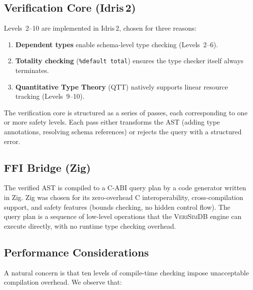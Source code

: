 \documentclass[11pt,a4paper]{article}
\newcommand{\VeriSimDB}{\textsc{VeriSimDB}}
\begin{document}
\subsection{Verification Core (Idris\,2)}

Levels~2--10 are implemented in Idris\,2, chosen for three reasons:
\begin{enumerate}[nosep]
  \item \textbf{Dependent types} enable schema-level type checking
    (Levels~2--6).
  \item \textbf{Totality checking} (\texttt{\%default total}) ensures
    the type checker itself always terminates.
  \item \textbf{Quantitative Type Theory} (QTT) natively supports
    linear resource tracking (Levels~9--10).
\end{enumerate}

The verification core is structured as a series of passes, each
corresponding to one or more safety levels.  Each pass either
transforms the AST (adding type annotations, resolving schema
references) or rejects the query with a structured error.

\subsection{FFI Bridge (Zig)}

The verified AST is compiled to a C-ABI query plan by a code generator
written in Zig.  Zig was chosen for its zero-overhead C interoperability,
cross-compilation support, and safety features (bounds checking,
no hidden control flow).  The query plan is a sequence of low-level
operations that the \VeriSimDB{} engine can execute directly, with
no runtime type checking overhead.

\subsection{Performance Considerations}

A natural concern is that ten levels of compile-time checking impose
unacceptable compilation overhead.  We observe that:
\end{document}
